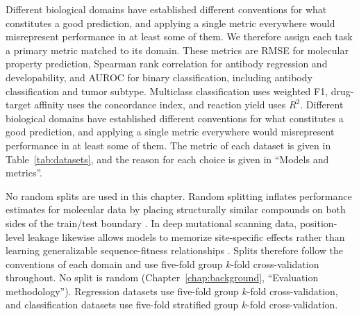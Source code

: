 Different biological domains have established different conventions for what constitutes a good prediction, and applying a single metric everywhere would misrepresent performance in at least some of them. We therefore assign each task a primary metric matched to its domain. These metrics are RMSE for molecular property prediction, Spearman rank correlation for antibody regression and developability, and AUROC for binary classification, including antibody classification and tumor subtype. Multiclass classification uses weighted F1, drug-target affinity uses the concordance index, and reaction yield uses $R^2$.
Different biological domains have established different conventions for what constitutes a good prediction, and applying a single metric everywhere would misrepresent performance in at least some of them. The metric of each dataset is given in Table~\ref{tab:datasets}, and the reason for each choice is given in ``Models and metrics''.

No random splits are used in this chapter. Random splitting inflates performance estimates for molecular data by placing structurally similar compounds on both sides of the train/test boundary \citep{Yang2019, Wallach2018}. In deep mutational scanning data, position-level leakage likewise allows models to memorize site-specific effects rather than learning generalizable sequence-fitness relationships \citep{Notin2023, Vieira2026}. Splits therefore follow the conventions of each domain and use five-fold group $k$-fold cross-validation throughout.
No split is random (Chapter~\ref{chap:background}, ``Evaluation methodology''). Regression datasets use five-fold group $k$-fold cross-validation, and classification datasets use five-fold stratified group $k$-fold cross-validation.

